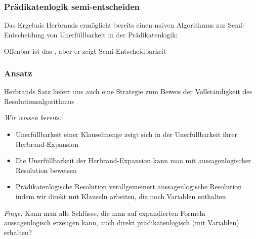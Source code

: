 \documentclass[aspectratio=1610,onlymath]{beamer}
\begin{document}
\begin{frame}\frametitle{Prädikatenlogik semi-entscheiden}

Das Ergebnis Herbrands ermöglicht bereits einen naiven Algorithmus zur Semi-Entscheidung von Unerfüllbarkeit in der Prädikatenlogik:\bigskip

\medskip

Offenbar ist das , aber er zeigt Semi-Entscheidbarkeit

\end{frame}


\begin{frame}\frametitle{Ansatz}

\alert{Herbrands Satz liefert uns auch eine Strategie zum Beweis der Vollständigkeit des Resolutionsalgorithmus}\bigskip

\emph{Wir wissen bereits:}
\begin{itemize}
\item Unerfüllbarkeit einer Klauselmenge zeigt sich in der Unerfüllbarkeit ihrer Herbrand-Expansion
\item Die Unerfüllbarkeit der Herbrand-Expansion kann man mit aussagenlogischer Resolution beweisen
\item Prädikatenlogische Resolution verallgemeinert aussagenlogische Resolution indem wir direkt mit Klauseln arbeiten, die noch Variablen enthalten
\end{itemize}\pause

\emph{Frage:} Kann man alle Schlüsse, die man auf expandierten Formeln aussagenlogisch erzeugen kann, auch direkt prädikatenlogisch (mit Variablen) erhalten?

\end{frame}
\end{document}
